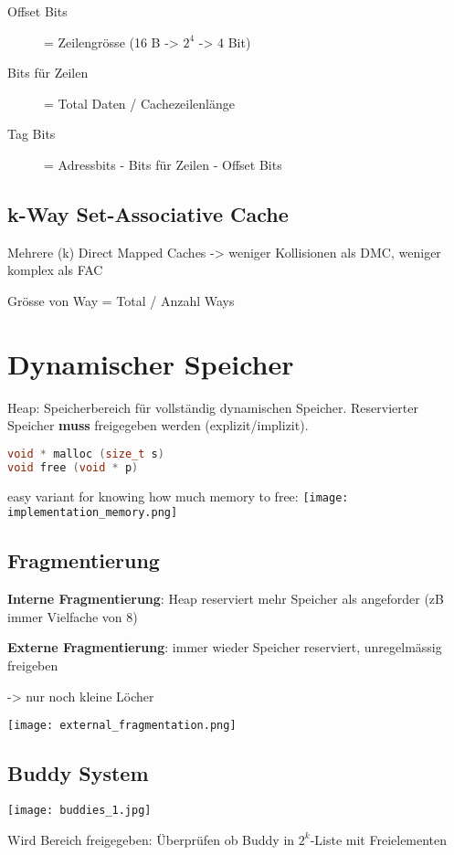 \begin{multicols*}{4}
\begin{description}
    \item[Offset Bits] = Zeilengrösse (16 B -> \(2^4\) -> 4 Bit)
    \item[Bits für Zeilen] = Total Daten / Cachezeilenlänge
    \item[Tag Bits] = Adressbits - Bits für Zeilen - Offset Bits
\end{description}

\subsection{k-Way Set-Associative Cache}
Mehrere (k) Direct Mapped Caches -> weniger Kollisionen als DMC, weniger komplex als FAC

Grösse von Way = Total / Anzahl Ways

\section{Dynamischer Speicher}
Heap: Speicherbereich für vollständig dynamischen Speicher. Reservierter Speicher \textbf{muss} freigegeben werden (explizit/implizit).

\begin{lstlisting}[language=c]
void * malloc (size_t s)
void free (void * p)
\end{lstlisting}

easy variant for knowing how much memory to free:
\texttt{[image: implementation\_memory.png]}

\subsection{Fragmentierung}
\textbf{Interne Fragmentierung}: Heap reserviert mehr Speicher als angeforder (zB immer Vielfache von 8)

\textbf{Externe Fragmentierung}: immer wieder Speicher reserviert, unregelmässig freigeben

-> nur noch kleine Löcher

\texttt{[image: external\_fragmentation.png]}

\subsection{Buddy System}

\texttt{[image: buddies\_1.jpg]}

Wird Bereich freigegeben: Überprüfen ob Buddy in \(2^k\)-Liste mit Freielementen


\end{multicols*}
